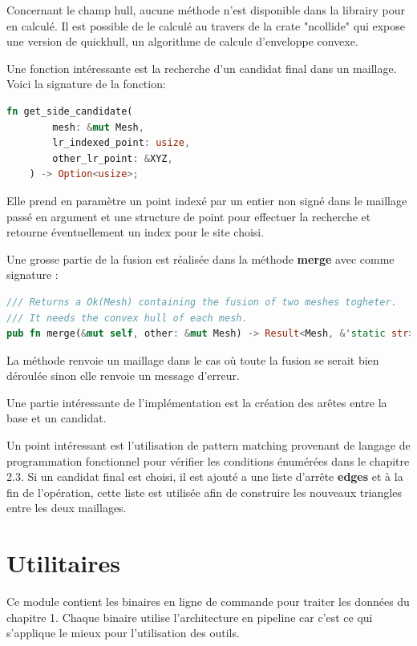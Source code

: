 Concernant le champ hull, aucune méthode n'est disponible dans la librairy pour en calculé. Il est possible de le calculé au travers de la crate "ncollide" qui expose une version de quickhull, un algorithme de calcule d'enveloppe convexe.

Une fonction intéressante est la recherche d'un candidat final dans un maillage. Voici la signature de la fonction:
\begin{lstlisting}[language=Rust, style=boxed]
fn get_side_candidate(
        mesh: &mut Mesh,
        lr_indexed_point: usize,
        other_lr_point: &XYZ,
    ) -> Option<usize>;
\end{lstlisting}

Elle prend en paramètre un point indexé par un entier non signé dans le maillage passé en argument et une structure de point pour effectuer la recherche et retourne éventuellement un index pour le site choisi.

Une grosse partie de la fusion est réalisée dans la méthode \textbf{merge} avec comme signature : 
\begin{lstlisting}[language=Rust, style=boxed]
/// Returns a Ok(Mesh) containing the fusion of two meshes togheter.
/// It needs the convex hull of each mesh.
pub fn merge(&mut self, other: &mut Mesh) -> Result<Mesh, &'static str>;
\end{lstlisting}

La méthode renvoie un maillage dans le cas où toute la fusion se serait bien déroulée sinon elle renvoie un message d'erreur.

Une partie intéressante de l'implémentation est la création des arêtes entre la base et un candidat.


Un point intéressant est l'utilisation de pattern matching provenant de langage de programmation fonctionnel pour vérifier les conditions énumérées dans le chapitre 2.3. Si un candidat final est choisi, il est ajouté a une liste d'arrête \textbf{edges} et à la fin de l'opération, cette liste est utilisée afin de construire les nouveaux triangles entre les deux maillages.

\section{Utilitaires}

Ce module contient les binaires en ligne de commande pour traiter les données du
chapitre 1.
Chaque binaire utilise l'architecture en pipeline car c'est ce qui s'applique le
mieux pour l'utilisation des outils.

